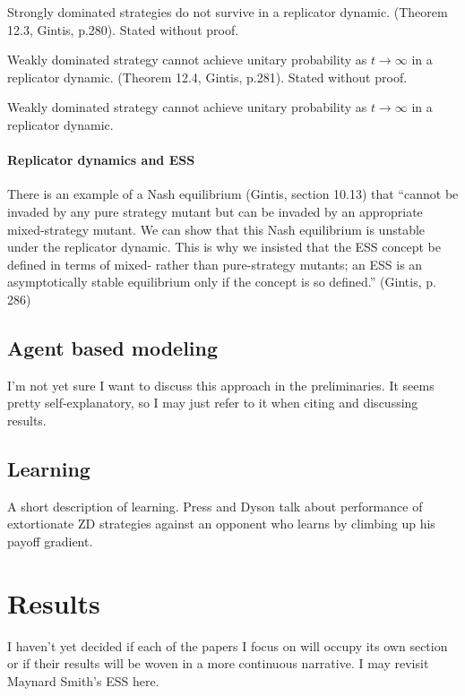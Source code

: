 \begin{theorem}
Strongly dominated strategies do not survive in a replicator dynamic. (Theorem 12.3, Gintis, p.280). Stated without proof.
\end{theorem}
\begin{theorem}
Weakly dominated strategy cannot achieve unitary probability as $t \rightarrow \infty$ in a replicator dynamic. (Theorem 12.4, Gintis, p.281). Stated without proof.
\end{theorem}

\begin{theorem}
Weakly dominated strategy cannot achieve unitary probability as $t \rightarrow \infty$ in a replicator dynamic.
\end{theorem}

\subsubsection{Replicator dynamics and ESS}
There is an example of a Nash equilibrium (Gintis, section 10.13) that ``cannot be invaded by any pure strategy mutant but can be invaded by an appropriate mixed-strategy mutant. We can show that this Nash equilibrium is unstable under the replicator dynamic. This is why we insisted that the ESS concept be defined in terms of mixed- rather than pure-strategy mutants; an ESS is an asymptotically stable equilibrium only if the concept is so defined.'' (Gintis, p. 286)

\section{Agent based modeling}
I'm not yet sure I want to discuss this approach in the preliminaries. It seems pretty self-explanatory, so I may just refer to it when citing and discussing results.

\section{Learning}
A short description of learning. Press and Dyson talk about performance of extortionate ZD strategies against an opponent who learns by climbing up his payoff gradient.

\chapter{Results}
I haven't yet decided if each of the papers I focus on will occupy its own section or if their results will be woven in a more continuous narrative. I may revisit Maynard Smith's ESS here.

